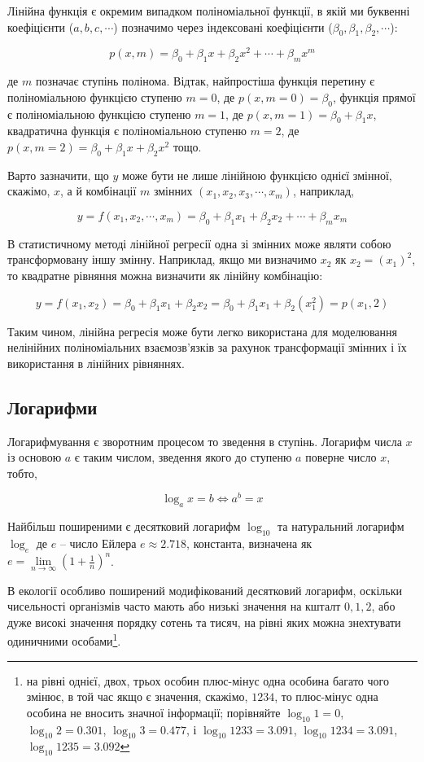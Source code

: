 \documentclass[
  11pt,
]{book}
\begin{document}
Лінійна функція є окремим випадком поліноміальної функції, в якій ми
буквенні коефіцієнти (\(a, b, c, \cdots\)) позначимо через індексовані
коефіцієнти (\(\beta_0, \beta_1, \beta_2, \cdots\)):

\[p(x, m) = \beta_0 + \beta_1 x + \beta_2 x^2 + \cdots + \beta_m x^m\]

де \(m\) позначає ступінь полінома. Відтак, найпростіша функція перетину
є поліноміальною функцією ступеню \(m = 0\), де
\(p(x, m = 0) = \beta_0\), функція прямої є поліноміальною функцією
ступеню \(m = 1\), де \(p(x, m = 1) = \beta_0 + \beta_1 x\), квадратична
функція є поліноміальною ступеню \(m = 2\), де
\(p(x, m = 2) = \beta_0 + \beta_1 x + \beta_2 x^2\) тощо.

Варто зазначити, що \(y\) може бути не лише лінійною функцією однієї
змінної, скажімо, \(x\), а й комбінації \(m\) змінних
\((x_1, x_2, x_3, \cdots, x_m)\), наприклад,

\[y = f(x_1, x_2, \cdots, x_m) = \beta_0 + \beta_1 x_1 + \beta_2 x_2 + \cdots + \beta_m x_m\]

В статистичному методі лінійної регресії одна зі змінних може являти
собою трансформовану іншу змінну. Наприклад, якщо ми визначимо \(x_2\)
як \(x_2 = (x_1)^2\), то квадратне рівняння можна визначити як лінійну
комбінацію:

\[y = f(x_1, x_2) = \beta_0 + \beta_1 x_1 + \beta_2 x_2 = \beta_0 + \beta_1 x_1 + \beta_2 (x_1^2) = p(x_1, 2)\]

Таким чином, лінійна регресія може бути легко використана для
моделювання нелінійних поліноміальних взаємозв'язків за рахунок
трансформації змінних і їх використання в лінійних рівняннях.

\subsection{Логарифми}\label{logs}

Логарифмування є зворотним процесом то зведення в ступінь. Логарифм
числа \(x\) із основою \(a\) є таким числом, зведення якого до ступеню
\(a\) поверне число \(x\), тобто,

\[\log_a x = b\iff a^b = x\]

Найбільш поширеними є десятковий логарифм \(\log_{10}\) та натуральний
логарифм \(\log_e\) де \(e\) -- число Ейлера \(e \approx 2.718\),
константа, визначена як
\(e = \lim\limits_{n \rightarrow \infty} (1 + \frac{1}{n})^n\).

В екології особливо поширений модифікований десятковий логарифм,
оскільки чисельності організмів часто мають або низькі значення на
кшталт \(0, 1, 2\), або дуже високі значення порядку сотень та тисяч, на
рівні яких можна знехтувати одиничними особами\footnote{на рівні однієї,
  двох, трьох особин плюс-мінус одна особина багато чого змінює, в той
  час якщо є значення, скажімо, \(1234\), то плюс-мінус одна особина не
  вносить значної інформації; порівняйте \(\log_{10} 1 = 0\),
  \(\log_{10} 2 = 0.301\), \(\log_{10} 3 = 0.477\), і
  \(\log_{10} 1233 = 3.091\), \(\log_{10} 1234 = 3.091\),
  \(\log_{10} 1235 = 3.092\)}.
\end{document}
